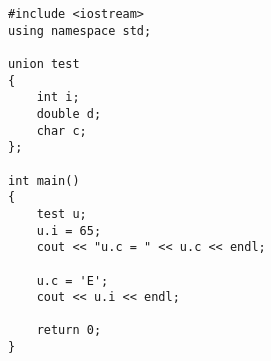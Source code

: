 \documentclass[12pt,a4paper]{article}
\begin{document}
\begin{lstlisting}[caption={\texttt{union}}]
#include <iostream>
using namespace std;

union test
{
	int i;
	double d;
	char c;
};

int main()
{
	test u;
	u.i = 65;
	cout << "u.c = " << u.c << endl;
	
	u.c = 'E';
	cout << u.i << endl;
	
	return 0;
}
\end{lstlisting}
\end{document}
